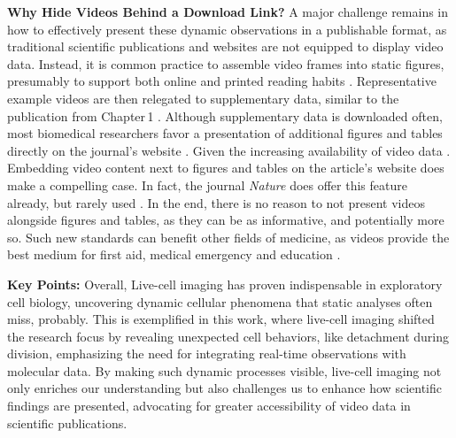 \textbf{Why Hide Videos Behind a Download Link?} A major challenge remains in
how to effectively present these dynamic observations in a publishable format,
as traditional scientific publications and websites are not equipped to display
video data. Instead, it is common practice to assemble video frames into static
figures, presumably to support both online and printed reading habits
\cite{perasDigitalPaperReading2023}. Representative example videos are then
relegated to supplementary data, similar to the publication from Chapter\,1
\cite{kuricModelingMyelomaDissemination2024}. Although supplementary data is
downloaded often, most biomedical researchers favor a presentation of additional
figures and tables directly on the journal's website
\cite{priceRoleSupplementaryMaterial2018}. Given the increasing availability of
video data%
. %
Embedding video content next to figures and tables on the article's website does
make a compelling case. In fact, the journal \emph{Nature} does offer this
feature already, but rarely used \cite{NatureVideoContent}. In the end, there is
no reason to not present videos alongside figures and tables, as they can be as
informative, and potentially more so. Such new standards can benefit other
fields of medicine, as videos provide the best medium for first aid, medical
emergency and education \cite{guptaDatasetMedicalInstructional2023}.

\textbf{Key Points:} Overall, Live-cell imaging has proven indispensable in
exploratory cell biology, uncovering dynamic cellular phenomena that static
analyses often miss, probably. This is exemplified in this work, where live-cell
imaging shifted the research focus by revealing unexpected cell behaviors, like
detachment during division, emphasizing the need for integrating real-time
observations with molecular data. By making such dynamic processes visible,
live-cell imaging not only enriches our understanding but also challenges us to
enhance how scientific findings are presented, advocating for greater
accessibility of video data in scientific publications.

\newpage


